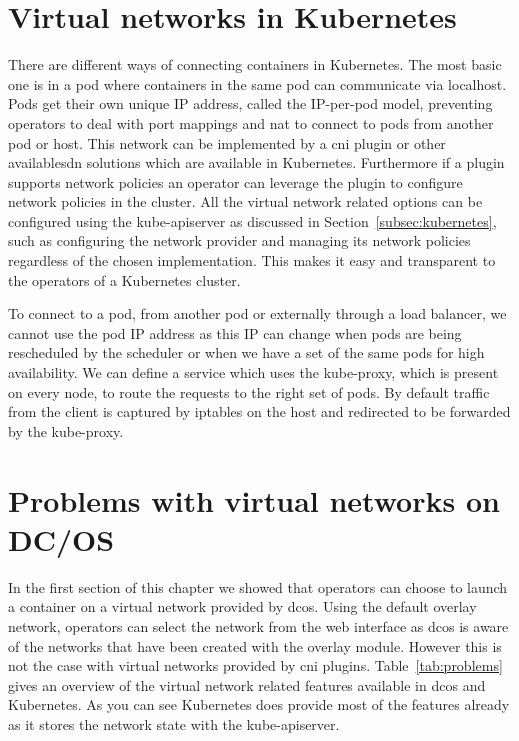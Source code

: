 \section{Virtual networks in Kubernetes}
\label{sec:k8s-virtual-networks}
There are different ways of connecting containers in Kubernetes. The most basic one is in a pod where containers in the same pod can communicate via localhost. Pods get their own unique IP address, called the IP-per-pod model, preventing operators to deal with port mappings and \gls{nat} to connect to pods from another pod or host. This network can be implemented by a \gls{cni} plugin or other available\gls{sdn} solutions\cite{k8s-network} which are available in Kubernetes. Furthermore if a plugin supports network policies an operator can leverage the plugin to configure network policies in the cluster. All the virtual network related options can be configured using the kube-apiserver as discussed in Section~\ref{subsec:kubernetes}, such as configuring the network provider and managing its network policies regardless of the chosen implementation. This makes it easy and transparent to the operators of a Kubernetes cluster.

To connect to a pod, from another pod or externally through a load balancer, we cannot use the pod IP address as this IP can change when pods are being rescheduled by the scheduler or when we have a set of the same pods for high availability. We can define a service which uses the kube-proxy, which is present on every node, to route the requests to the right set of pods. By default traffic from the client is captured by iptables\cite{iptables} on the host and redirected to be forwarded by the kube-proxy.

\section{Problems with virtual networks on DC/OS}
\label{sec:problems}
In the first section of this chapter we showed that operators can choose to launch a container on a virtual network provided by \gls{dcos}. Using the default overlay network, operators can select the network from the web interface as \gls{dcos} is aware of the networks that have been created with the overlay module. However this is not the case with virtual networks provided by \gls{cni} plugins. Table~\ref{tab:problems} gives an overview of the virtual network related features available in \gls{dcos} and Kubernetes. As you can see Kubernetes does provide most of the features already as it stores the network state with the kube-apiserver.

